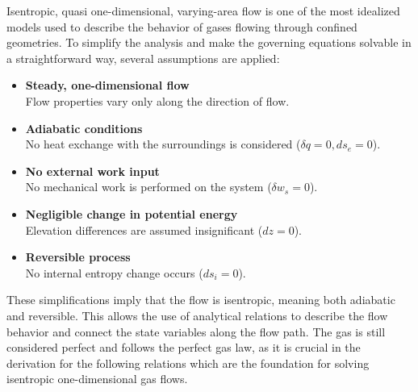 	Isentropic, quasi one-dimensional, varying-area flow is one of the most idealized models used to describe the behavior of gases flowing through confined geometries.
	To simplify the analysis and make the governing equations solvable in a straightforward way, several assumptions are applied:
	\begin{itemize}
	    \item \textbf{Steady, one-dimensional flow}\\
		Flow properties vary only along the direction of flow.
	    \item \textbf{Adiabatic conditions}\\
		No heat exchange with the surroundings is considered ($\delta q = 0, ds_e = 0$).
	    \item \textbf{No external work input}\\
		No mechanical work is performed on the system ($\delta w_s = 0$).
	    \item \textbf{Negligible change in potential energy}\\
		Elevation differences are assumed insignificant ($dz = 0$).
	    \item \textbf{Reversible process}\\
		No internal entropy change occurs ($ds_i = 0$).
	\end{itemize}
	These simplifications imply that the flow is isentropic, meaning both adiabatic and reversible.
	This allows the use of analytical relations to describe the flow behavior and connect the state variables along the flow path.
	The gas is still considered perfect and follows the perfect gas law, as it is crucial in the derivation for the following relations which are the foundation for solving isentropic one-dimensional gas flows.

